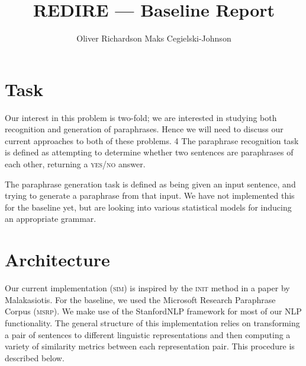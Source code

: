 \documentclass[11pt, reqno]{amsart}
\newcommand{\mala}{Malakasiotis}
\begin{document}
	\title{REDIRE --- Baseline Report}
	
	\author{\textsc Oliver Richardson \hspace{2em} Maks Cegielski-Johnson}
	
	\maketitle 
	
	\vspace{-2em}
	
	\section{Task}

	Our interest in this problem is two-fold; we are interested in studying both recognition and generation of paraphrases. Hence we will need to discuss our current approaches to both of these problems. 
4	
	The paraphrase recognition task is defined as attempting to determine whether two sentences are paraphrases of each other, returning a \textsc{yes/no} answer.
	
	The paraphrase generation task is defined as being given an input sentence, and trying to generate a paraphrase from that input. We have not implemented this for the baseline yet, but are looking into various statistical models for inducing an appropriate grammar. %
	

	
	\section{Architecture}
	Our current implementation (\textsc{sim}) is inspired by the \textsc{init} method in a paper by \mala \cite{malakasiotis2009paraphrase}. For the baseline, we used the Microsoft Research Paraphrase Corpus\cite{msrp} (\textsc{msrp}). We make use of the StanfordNLP framework\cite{manning-EtAl:2014:P14-5} for most of our NLP functionality. The general structure of this implementation relies on transforming a pair of sentences to different linguistic representations and then computing a variety of similarity metrics between each representation pair. This procedure is described below.
	
\end{document}
